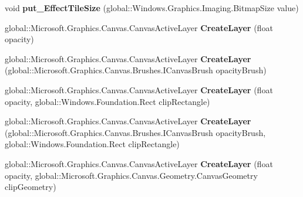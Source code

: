 \begin{DoxyCompactItemize}
void {\bfseries put\+\_\+\+Effect\+Tile\+Size} (global\+::\+Windows.\+Graphics.\+Imaging.\+Bitmap\+Size value)
\item 
\mbox{\label{interface_microsoft_1_1_graphics_1_1_canvas_1_1_i_canvas_drawing_session_a184d966bb56bf3a3cdb5c53f3ef9f3c1}} 
global\+::\+Microsoft.\+Graphics.\+Canvas.\+Canvas\+Active\+Layer {\bfseries Create\+Layer} (float opacity)
\item 
\mbox{\label{interface_microsoft_1_1_graphics_1_1_canvas_1_1_i_canvas_drawing_session_a20701590f19d65d6980d108dfc7a2e19}} 
global\+::\+Microsoft.\+Graphics.\+Canvas.\+Canvas\+Active\+Layer {\bfseries Create\+Layer} (global\+::\+Microsoft.\+Graphics.\+Canvas.\+Brushes.\+I\+Canvas\+Brush opacity\+Brush)
\item 
\mbox{\label{interface_microsoft_1_1_graphics_1_1_canvas_1_1_i_canvas_drawing_session_a7bc31c638ab7c078564b2ba851ac2487}} 
global\+::\+Microsoft.\+Graphics.\+Canvas.\+Canvas\+Active\+Layer {\bfseries Create\+Layer} (float opacity, global\+::\+Windows.\+Foundation.\+Rect clip\+Rectangle)
\item 
\mbox{\label{interface_microsoft_1_1_graphics_1_1_canvas_1_1_i_canvas_drawing_session_af8fe4d3bfd7c8f1e636ea08505d1db2c}} 
global\+::\+Microsoft.\+Graphics.\+Canvas.\+Canvas\+Active\+Layer {\bfseries Create\+Layer} (global\+::\+Microsoft.\+Graphics.\+Canvas.\+Brushes.\+I\+Canvas\+Brush opacity\+Brush, global\+::\+Windows.\+Foundation.\+Rect clip\+Rectangle)
\item 
\mbox{\label{interface_microsoft_1_1_graphics_1_1_canvas_1_1_i_canvas_drawing_session_a3bbbcb2cdd79faaa6670d8ba3144611e}} 
global\+::\+Microsoft.\+Graphics.\+Canvas.\+Canvas\+Active\+Layer {\bfseries Create\+Layer} (float opacity, global\+::\+Microsoft.\+Graphics.\+Canvas.\+Geometry.\+Canvas\+Geometry clip\+Geometry)
\item 
\mbox{\label{interface_microsoft_1_1_graphics_1_1_canvas_1_1_i_canvas_drawing_session_a18667b1e3c095941bd2e4afcfb66ff4a}} 

\end{DoxyCompactItemize}
